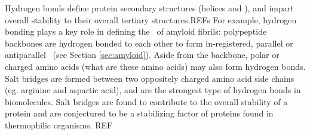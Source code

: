 Hydrogen bonds define protein secondary structures (helices and \bsheets), and impart overall stability to their overall tertiary structures.REFs For example, hydrogen bonding plays a key role in defining the \crossbs\ of amyloid fibrils: polypeptide backbones are hydrogen bonded to each other to form in-registered, parallel or antiparallel \bsheets\ (see Section \ref{sec:amyloid}). Aside from the backbone, polar or charged amino acids (what are these amino acids) may also form hydrogen bonds. Salt bridges are formed between two oppositely charged amino acid side chains (eg. arginine and aspartic acid), and are the strongest type of hydrogen bonds in biomolecules. Salt bridges are found to contribute to the overall stability of a protein and are conjectured to be a stabilizing factor of proteins found in thermophilic organisms. REF




